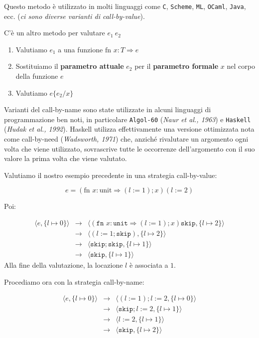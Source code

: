 Questo metodo è utilizzato in molti linguaggi come \texttt{C}, \texttt{Scheme}, \texttt{ML},
\texttt{OCaml}, \texttt{Java}, ecc. (\textit{ci sono diverse varianti di call-by-value}).

C'è un altro metodo per valutare $e_1 \ e_2$
\begin{tcolorbox}[title = Call-by-name (\textit{detta anche valutazione lazy})]
    \begin{enumerate}
        \item Valutiamo $e_1$ a una funzione $\text{fn } x:T \Rightarrow e$
        \item Sostituiamo il \textbf{parametro attuale} $e_2$ per il \textbf{parametro
        formale} $x$ nel corpo della funzione $e$
        \item Valutiamo $e\{e_2/x\}$
    \end{enumerate}
\end{tcolorbox}
Varianti del call-by-name sono state utilizzate in alcuni linguaggi
di programmazione ben noti, in particolare \texttt{Algol-60} (\textit{Naur et al., 1963})
e \texttt{Haskell} (\textit{Hudak et al., 1992}). Haskell utilizza effettivamente una versione
ottimizzata nota come call-by-need (\textit{Wadsworth, 1971}) che, anziché rivalutare
un argomento ogni volta che viene utilizzato, sovrascrive tutte le occorrenze
dell'argomento con il suo valore la prima volta che viene valutato.

Valutiamo il nostro esempio precedente in una strategia call-by-value:

\[ e = (\text{fn } x : \text{unit} \Rightarrow (l:=1);x)(l:=2) \]

Poi:

\[
\begin{array}{lll}
    \langle e, \{l \mapsto 0\}\rangle & \rightarrow &
    \langle (\texttt{fn } x : \texttt{unit} \Rightarrow (l:= 1); x)\texttt{skip}, \{l \mapsto 2\} \rangle\\
    & \rightarrow & \langle (l:=1;\texttt{skip}), \{l \mapsto 2\} \rangle \\
    & \rightarrow & \langle \texttt{skip};\texttt{skip}, \{l \mapsto 1\} \rangle \\
    & \rightarrow & \langle \texttt{skip}, \{l \mapsto 1\} \rangle
\end{array}
\]
Alla fine della valutazione, la locazione $l$ è associata a $1$.

Procediamo ora con la strategia call-by-name:

\[
\begin{array}{lll}
    \langle e, \{l \mapsto 0\}\rangle &\rightarrow& \langle (l:=1);l := 2, \{l \mapsto 0\} \rangle  \\
    & \rightarrow & \langle \texttt{skip};l := 2, \{l \mapsto 1\} \rangle \\
    & \rightarrow & \langle l := 2, \{l \mapsto 1\} \rangle \\
    & \rightarrow & \langle \texttt{skip}, \{l \mapsto 2\} \rangle
\end{array}
\]

